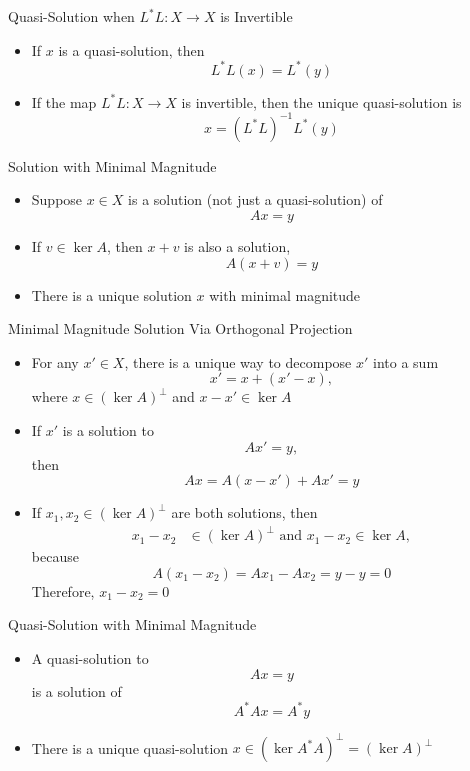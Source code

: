 \documentclass[usenames,dvipsnames,10pt]{beamer}
\begin{document}
\begin{frame}
  {Quasi-Solution when $L^*L: X \rightarrow X$ is Invertible}

  \begin{itemize}
  \item If $x$ is a quasi-solution, then
    \[
      L^*L(x) = L^*(y)
    \]
  \item If the map $L^*L: X \rightarrow X$ is invertible, then the unique quasi-solution is
    \[
      x = (L^*L)^{-1}L^*(y)
    \]
  \end{itemize}
\end{frame}

\begin{frame}
  {Solution with Minimal Magnitude}

  \begin{itemize}
  \item Suppose $x \in X$ is a solution (not just a quasi-solution) of
    \[
      Ax = y
    \]
  \item If $v \in \ker A$, then $x + v$ is also a solution,
    \[
      A(x+v) = y
    \]
  \item There is a unique solution $x$ with minimal magnitude
  \end{itemize}
\end{frame}

\begin{frame}
  {Minimal Magnitude Solution Via Orthogonal Projection}

  \begin{itemize}
  \item For any $x' \in X$, there is a unique way to decompose $x'$ into a sum
    \[
      x' = x + (x'-x),
    \]
    where $x \in (\ker A)^\perp$ and $x-x' \in \ker A$
  \item If $x'$ is a solution to
    \[
      Ax' = y,
    \]
    then
    \[
      Ax = A(x-x') + Ax' = y
    \]
  \item If $x_1, x_2 \in (\ker A)^\perp$ are both solutions, then
    \begin{align*}
      x_1-x_2 &\in (\ker A)^\perp\text{ and }x_1 - x_2 \in \ker A,
    \end{align*}
    because
    \[
      A(x_1-x_2) = Ax_1 - Ax_2 = y - y = 0
    \]
    Therefore, $x_1 - x_2 = 0$
  \end{itemize}
\end{frame}

\begin{frame}
  {Quasi-Solution with Minimal Magnitude}

  \begin{itemize}
  \item A quasi-solution to
    \[
      Ax = y
    \]
    is a solution of
    \[
      A^*Ax = A^*y
    \]
  \item There is a unique quasi-solution $x \in (\ker A^*A)^\perp = (\ker A)^\perp$
  \end{itemize}
\end{frame}
\end{document}
